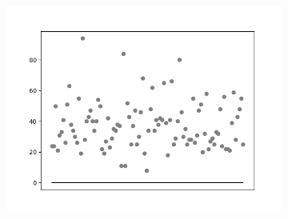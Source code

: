 \begin{figure}[hb!]
\begin{subfigure}[hb]{0.5\linewidth}
		 \includegraphics[width=\linewidth]{img/graficos/reta0/lenet/fig-reta-0-image-treat-3-lenet-lrelu.png}
		\end{subfigure}%
	\end{figure}

